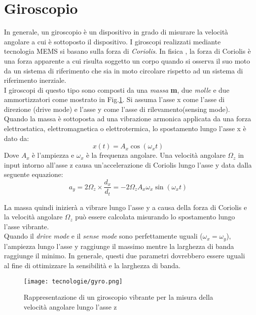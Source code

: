 \section{Giroscopio}
\label{giroscopi}
In generale, un giroscopio è un dispositivo in grado di misurare la velocità angolare a cui è sottoposto il dispositivo. I giroscopi realizzati mediante tecnologia MEMS si basano sulla forza di \textit{Coriolis}. In fisica \cite{corolois}, la forza di Coriolis è una forza apparente a cui risulta soggetto un corpo quando si osserva il suo moto da un sistema di riferimento che sia in moto circolare rispetto ad un sistema di riferimento inerziale. \\
I giroscopi di questo tipo sono composti \cite{gyroMems} da una \textit{massa} \textbf{m}, due \textit{molle} e due ammortizzatori come mostrato in Fig.\ref{fig:gyro}. Si assuma  l'asse x come l'asse di direzione (drive mode) e l'asse y come l'asse di rilevamento(sensing mode). Quando la massa è sottoposta ad una vibrazione armonica applicata da una forza elettrostatica, elettromagnetica o elettrotermica, lo spostamento lungo l'asse x è dato da:
\begin{equation}
x(t) = A_x \cos(\omega_x t)
\end{equation}
Dove $A_x$ è l'ampiezza e $\omega_x$ è la frequenza angolare.  Una velocità angolare $\Omega_z$ in input intorno all'asse z causa un'accelerazione di Coriolis lungo l'asse y data dalla seguente equazione:
\begin{equation}
a_y= 2\Omega_z \times \frac{d_x}{d_t}= -2\Omega_z A_x \omega_x \sin(\omega_x t)
\end{equation}

La massa quindi inizierà a vibrare lungo l'asse y a causa della forza di Coriolis e la velocità angolare $\Omega_z$ può essere calcolata misurando lo spostamento lungo l'asse vibrante. \\
Quando il \textit{drive mode} e il \textit{sense mode} sono perfettamente uguali ($\omega_x = \omega_y$), l'ampiezza lungo l'asse y raggiunge il massimo mentre la larghezza di banda raggiunge il minimo. In generale, questi due parametri dovrebbero essere uguali al fine di ottimizzare la sensibilità e la larghezza di banda.
 \begin{figure}[H]  
	\centering 
	\texttt{[image: tecnologie/gyro.png]}
	\caption{Rappresentazione di un giroscopio vibrante per la misura della velocità angolare lungo l'asse z}
	\label{fig:gyro}
\end{figure}





